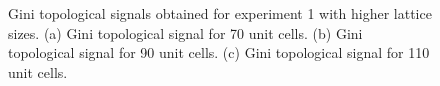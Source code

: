 \documentclass[fleqn,10pt]{wlscirep}
\begin{document}
\begin{figure}
\centering
{}
\caption{Gini topological signals obtained for experiment 1 with higher lattice sizes. (a) Gini topological signal for 70 unit cells. (b) Gini topological signal for 90 unit cells. (c) Gini topological signal for 110 unit cells.}
\label{newtopsig1}
\end{figure}
\end{document}

